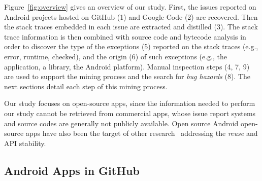 Figure~\ref{fig:overview} gives an overview of our study.
First,  the issues reported on Android projects hosted on GitHub (1) and Google Code (2) are recovered.
Then the stack traces embedded in each issue are extracted and distilled (3).
The stack trace information is then combined with source code and bytecode analysis in order to discover 
the type of the exceptions (5) reported on the stack traces (e.g., error, runtime, checked),
and the origin (6) of such exceptions 
(e.g., the application, a library, the Android platform). 
Manual inspection steps (4, 7, 9) are used to support the mining process  and 
the search for \emph{bug hazards}  (8). The next sections detail each step of this mining process.

Our study focuses on open-source apps, since the information needed to perform our study
cannot be retrieved from commercial apps, whose issue report systems and 
source codes are generally not publicly available. 
Open source Android open-source apps have also been the 
target of other research~\cite{Linar13,Ruiz12} addressing the \emph{reuse} and API stability. 





\subsection{Android Apps in GitHub}
\label{sec:git}



